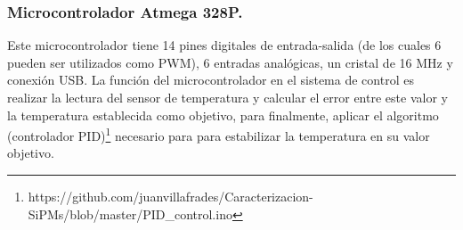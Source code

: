 \subsubsection{Microcontrolador Atmega 328P.}
Este microcontrolador tiene 14 pines digitales de entrada-salida (de los cuales 6 pueden ser utilizados como PWM), 6 entradas analógicas, un cristal de 16 MHz y conexión USB. La función del microcontrolador en el sistema de control es realizar la lectura del sensor de temperatura y calcular el error entre este valor y la temperatura establecida como objetivo, para finalmente, aplicar el algoritmo (controlador PID)\footnote{https://github.com/juanvillafrades/Caracterizacion-SiPMs/blob/master/PID\_control.ino} necesario para para estabilizar la temperatura en su valor objetivo.   

